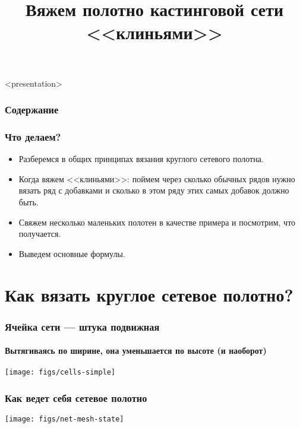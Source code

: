 

\title[Полотно кастинговой сети]{Вяжем полотно кастинговой сети <<клиньями>>}



\begin{frame}<presentation>
    \frametitle{Содержание}
    \tableofcontents
\end{frame}

\begin{frame}
    \frametitle{Что делаем?}

	\begin{itemize}
		\item Разберемся в общих принципах вязания круглого сетевого полотна.
		\item Когда вяжем <<клиньями>>: поймем через сколько обычных рядов нужно вязать ряд с добавками и сколько в этом ряду этих самых добавок должно быть. 
		\item Свяжем несколько маленьких полотен в качестве примера и посмотрим, что получается.
		\item Выведем основные формулы.
	\end{itemize}
\end{frame}


\section{Как вязать круглое сетевое полотно?}

\begin{frame}
    \frametitle{Ячейка сети --- штука подвижная}
    \framesubtitle{Вытягиваясь по ширине, она уменьшается по высоте (и наоборот)}

    \begin{center}
        \texttt{[image: figs/cells-simple]}
    \end{center}
\end{frame}

\begin{frame}
    \frametitle{Как ведет себя сетевое полотно}

    \begin{center}
        \texttt{[image: figs/net-mesh-state]}
    \end{center}
\end{frame}


